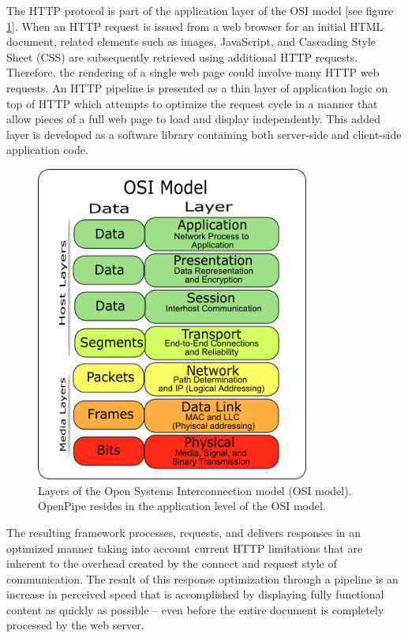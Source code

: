 \documentclass[12pt]{report}
\begin{document}
The HTTP protocol is part of the application layer of the OSI model [see figure \ref{fig:osiModel}].  When an HTTP request is issued from a web browser for an initial HTML document, related elements such as images, JavaScript, and Cascading Style Sheet (CSS) are subsequently retrieved using additional HTTP requests. Therefore, the rendering of a single web page could involve many HTTP web requests. An HTTP pipeline is presented as a thin layer of application logic on top of HTTP which attempts to optimize the request cycle in a manner that allow pieces of a full web page to load and display independently.  This added layer is developed as a software library containing both server-side and client-side application code.

\begin{figure}[H]
\label{fig:osiModel}
\centering
\includegraphics[width=90mm]{figures/images/osi_model.png}
\caption{Layers of the Open Systems Interconnection model (OSI model). OpenPipe resides in the application level of the OSI model.}
\end{figure}

The resulting framework processes, requests, and delivers responses in an optimized manner taking into account current HTTP limitations that are inherent to the overhead created by the connect and request style of communication. The result of this response optimization through a pipeline is an increase in perceived speed that is accomplished by displaying fully functional content as quickly as possible – even before the entire document is completely processed by the web server.
\end{document}
